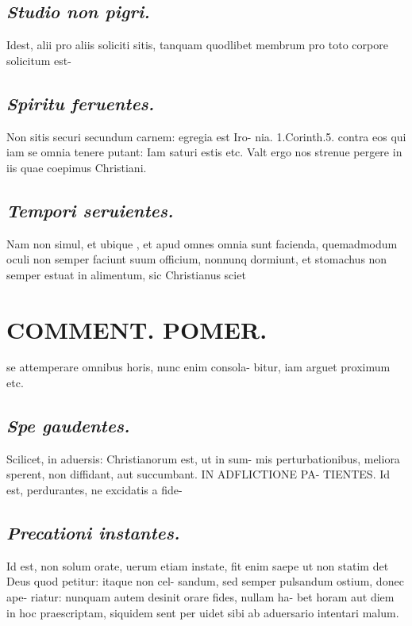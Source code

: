 \documentclass{article}
\begin{document}
\begin{pages}
\subsection*{\textit{Studio non pigri. }}\pstart Idest, alii pro aliis soliciti sitis, tanquam quodlibet membrum pro toto corpore solicitum est-  \pend
{}
{}
\subsection*{\textit{Spiritu feruentes. }}\pstart Non sitis securi secundum carnem: egregia est Iro- nia. 1.Corinth.5. contra eos qui iam se omnia tenere putant: Iam saturi estis etc. Valt ergo nos strenue pergere in iis quae coepimus Christiani.  \pend
{}
{}
\subsection*{\textit{Tempori seruientes. }}\pstart Nam non simul, et ubique , et apud omnes omnia sunt facienda, quemadmodum oculi non semper faciunt suum officium, nonnunq dormiunt, et stomachus non semper estuat in alimentum, sic Christianus sciet  \pend
\section*{COMMENT. POMER.  }\pstart se attemperare omnibus horis, nunc enim consola- bitur, iam arguet proximum etc.   \pend
{}
{}
\subsection*{\textit{Spe gaudentes. }}\pstart Scilicet, in aduersis: Christianorum est, ut in sum- mis perturbationibus, meliora sperent, non diffidant, aut succumbant. IN ADFLICTIONE PA- TIENTES. Id est, perdurantes, ne excidatis a fide-  \pend
{}
{}
\subsection*{\textit{Precationi instantes. }}\pstart Id est, non solum orate, uerum etiam instate, fit enim saepe ut non statim det Deus quod petitur: itaque non cel- sandum, sed semper pulsandum ostium, donec ape- riatur: nunquam autem desinit orare fides, nullam ha- bet horam aut diem in hoc praescriptam, siquidem sent per uidet sibi ab aduersario intentari malum.   \pend
{}
{}

\end{pages}
\end{document}
